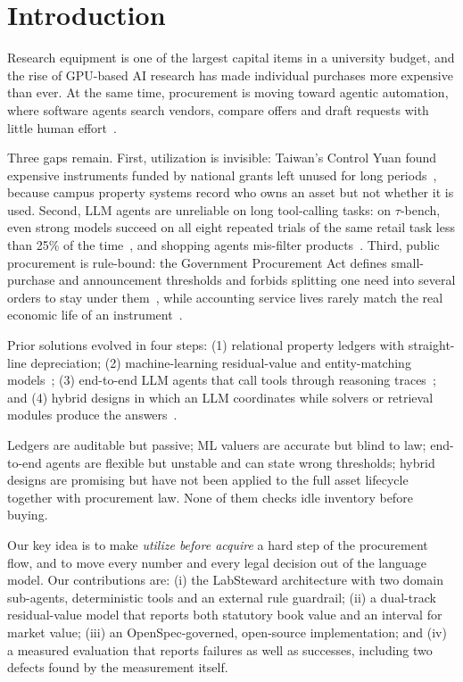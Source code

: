 \documentclass[conference]{IEEEtran}
\begin{document}
\section{Introduction}
Research equipment is one of the largest capital items in a university
budget, and the rise of GPU-based AI research has made individual
purchases more expensive than ever. At the same time, procurement is
moving toward agentic automation, where software agents search vendors,
compare offers and draft requests with little human
effort~\cite{yao2023react,singh2025agenticrag}.

Three gaps remain. First, utilization is invisible: Taiwan's Control
Yuan found expensive instruments funded by national grants left unused
for long periods~\cite{controlyuan2013}, because campus property systems
record who owns an asset but not whether it is used. Second, LLM agents
are unreliable on long tool-calling tasks: on $\tau$-bench, even strong
models succeed on all eight repeated trials of the same retail task less
than 25\% of the time~\cite{yao2024taubench}, and shopping agents
mis-filter products~\cite{lyu2025deepshop}. Third, public procurement is
rule-bound: the Government Procurement Act defines small-purchase and
announcement thresholds and forbids splitting one need into several
orders to stay under them~\cite{gpa_tw}, while accounting service lives
rarely match the real economic life of an instrument~\cite{huymajer2025residual}.

Prior solutions evolved in four steps: (1) relational property ledgers
with straight-line depreciation; (2) machine-learning residual-value and
entity-matching models~\cite{huymajer2025residual,peeters2025entity};
(3) end-to-end LLM agents that call tools through
reasoning traces~\cite{yao2023react,schick2023toolformer}; and (4)
hybrid designs in which an LLM coordinates while solvers or retrieval
modules produce the answers~\cite{duan2025askclarify,singh2025agenticrag}.

Ledgers are auditable but passive; ML valuers are accurate but blind to
law; end-to-end agents are flexible but unstable and can state wrong
thresholds; hybrid designs are promising but have not been applied to
the full asset lifecycle together with procurement law. None of them
checks idle inventory before buying.

Our key idea is to make \emph{utilize before acquire} a hard step of the
procurement flow, and to move every number and every legal decision out
of the language model. Our contributions are: (i) the LabSteward
architecture with two domain sub-agents, deterministic tools and an
external rule guardrail; (ii) a dual-track residual-value model that
reports both statutory book value and an interval for market value;
(iii) an OpenSpec-governed, open-source implementation; and (iv) a
measured evaluation that reports failures as well as successes,
including two defects found by the measurement itself.
\end{document}
